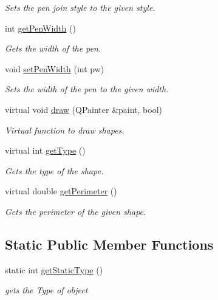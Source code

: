\begin{DoxyCompactItemize}
\begin{DoxyCompactList}\small\item\em Sets the pen join style to the given style. \end{DoxyCompactList}\item 
int \hyperlink{classLine_aedbb24685047a4f591fab1b8b7d39125}{get\+Pen\+Width} ()
\begin{DoxyCompactList}\small\item\em Gets the width of the pen. \end{DoxyCompactList}\item 
void \hyperlink{classLine_ade580b43a443e60b77bef50ae98493a2}{set\+Pen\+Width} (int pw)
\begin{DoxyCompactList}\small\item\em Sets the width of the pen to the given width. \end{DoxyCompactList}\item 
virtual void \hyperlink{classLine_a3bcbb11a1d79a7f9a60cc1aac3ab1bb5}{draw} (Q\+Painter \&paint, bool)
\begin{DoxyCompactList}\small\item\em Virtual function to draw shapes. \end{DoxyCompactList}\item 
virtual int \hyperlink{classLine_a249b46f2c7dab063ac4754dbae444468}{get\+Type} ()
\begin{DoxyCompactList}\small\item\em Gets the type of the shape. \end{DoxyCompactList}\item 
virtual double \hyperlink{classLine_ad63a55614d118000935e585f3551f630}{get\+Perimeter} ()
\begin{DoxyCompactList}\small\item\em Gets the perimeter of the given shape. \end{DoxyCompactList}\end{DoxyCompactItemize}
\subsection*{Static Public Member Functions}
\begin{DoxyCompactItemize}
\item 
static int \hyperlink{classLine_aec5465504d5c944920fd96a7d81c8472}{get\+Static\+Type} ()
\begin{DoxyCompactList}\small\item\em gets the Type of object \end{DoxyCompactList}\end{DoxyCompactItemize}


